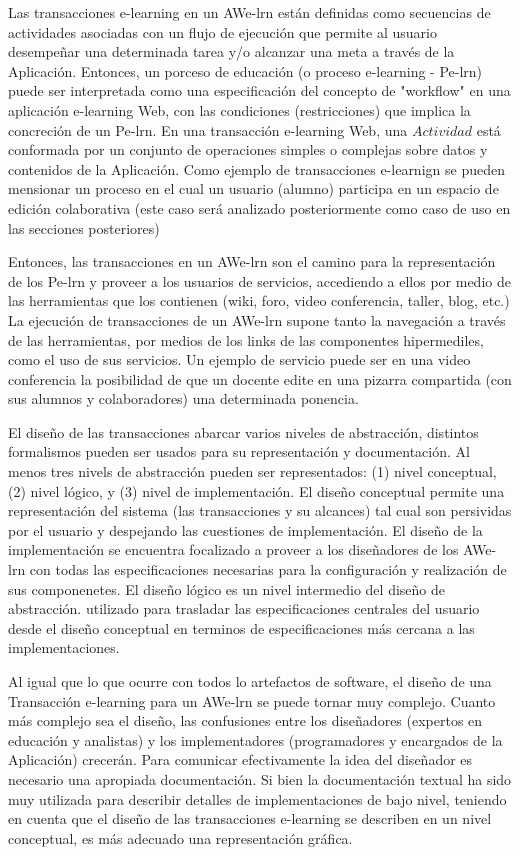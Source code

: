 \documentclass[12 pt,a4paper]{llncs}
\begin{document}
Las transacciones e-learning en un AWe-lrn están definidas como secuencias de actividades asociadas con un flujo de ejecución que permite al usuario desempeñar una determinada tarea  y/o alcanzar una meta a través de la Aplicación. Entonces, un porceso de educación (o proceso e-learning - Pe-lrn) puede ser interpretada como una especificación del concepto de "workflow" en una aplicación e-learning Web, con las condiciones (restricciones) que implica la concreción de un Pe-lrn. En una transacción e-learning Web, una  $Actividad$ está  conformada por un conjunto de operaciones simples o complejas sobre datos y contenidos de la Aplicación. Como ejemplo de transacciones e-learnign se pueden mensionar un proceso en el cual un usuario (alumno) participa en un espacio de edición colaborativa (este caso será analizado posteriormente como caso de uso en las secciones posteriores) 

Entonces, las transacciones en un AWe-lrn son el camino para la representación de los Pe-lrn y proveer a los usuarios de servicios, accediendo a ellos por medio de las herramientas que los contienen (wiki, foro, video conferencia, taller, blog, etc.) La ejecución de transacciones de un AWe-lrn supone tanto la navegación a través de las herramientas, por medios de los links de las componentes hipermediles, como  el uso de sus servicios. Un ejemplo de servicio puede ser en una video conferencia la posibilidad de que un docente edite en una pizarra compartida (con sus alumnos y colaboradores) una determinada ponencia. 

El diseño de las transacciones abarcar varios niveles de abstracción, distintos formalismos pueden ser usados para su representación y documentación. Al menos tres nivels de abstracción pueden ser representados: (1) nivel conceptual, (2) nivel lógico, y (3) nivel de implementación.  El diseño conceptual permite una representación del sistema (las transacciones y su alcances) tal cual son persividas por el usuario y despejando las cuestiones de implementación. El diseño de la implementación se encuentra focalizado a proveer a los diseñadores de los AWe-lrn con todas las especificaciones necesarias para la configuración y realización de sus componenetes. El diseño lógico es un nivel intermedio del diseño de abstracción. utilizado para  trasladar las especificaciones centrales del usuario desde el diseño conceptual en terminos de  especificaciones más cercana a las implementaciones.

Al igual que lo que ocurre con todos lo artefactos de software, el diseño de una Transacción e-learning para un AWe-lrn  se puede tornar muy complejo. Cuanto más complejo sea el diseño, las confusiones entre los diseñadores (expertos en educación y analistas) y los implementadores (programadores y  encargados de la Aplicación) crecerán. Para comunicar efectivamente la idea del diseñador es necesario una apropiada documentación. Si bien la documentación textual ha sido muy utilizada para describir detalles de implementaciones de bajo nivel, teniendo en cuenta que el diseño de las transacciones e-learning se describen en un  nivel conceptual, es más adecuado una representación gráfica. 
\end{document}
